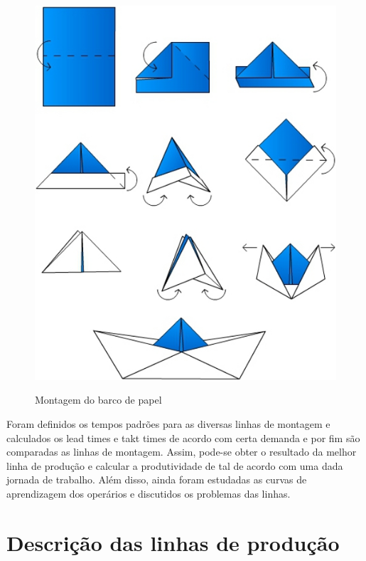 \documentclass[
	12pt,				%
	oneside,			%
	a4paper,			%
	english,			%
	french,				%
	spanish,			%
	brazil,				%
	]{abntex2}
\begin{document}
\begin{figure}[H]
\begin{center}

\includegraphics[scale=1]{1.jpg} 

\label{fig1}
\caption{Montagem do barco de papel}
\end{center}
\end{figure}

Foram definidos os tempos padrões para as diversas linhas de montagem e calculados os lead times e takt times de acordo com certa demanda e por fim são comparadas as linhas de montagem. Assim, pode-se obter o resultado da melhor linha de produção e calcular a produtividade de tal de acordo com uma dada jornada de trabalho. Além disso, ainda foram estudadas as curvas de aprendizagem dos operários e discutidos os problemas das linhas.


\newpage
\section[Descrição das linhas de produção]{Descrição das linhas de produção}
\pagestyle{fancy}
\end{document}
